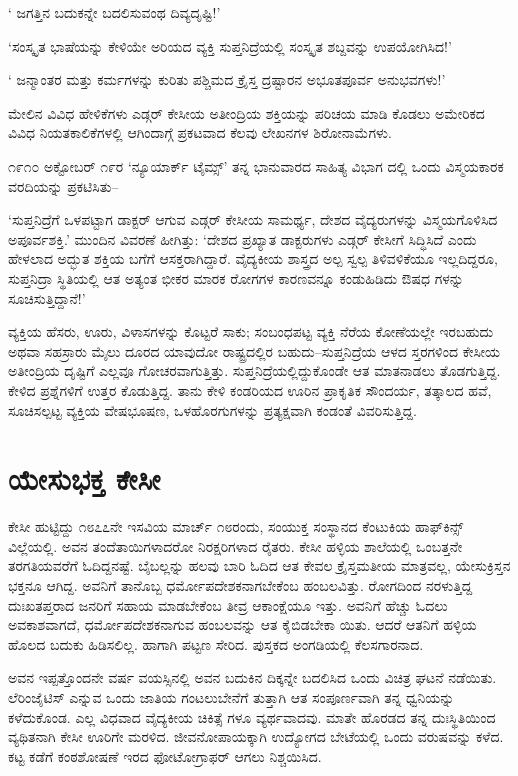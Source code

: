 ‘ ಜಗತ್ತಿನ ಬದುಕನ್ನೇ ಬದಲಿಸುವಂಥ ದಿವ್ಯದೃಷ್ಟಿ!’

‘ಸಂಸ್ಕೃತ ಭಾಷೆಯನ್ನು ಕೇಳಿಯೇ ಅರಿಯದ ವ್ಯಕ್ತಿ ಸುಪ್ತನಿದ್ರೆಯಲ್ಲಿ ಸಂಸ್ಕೃತ ಶಬ್ದವನ್ನು ಉಪಯೋಗಿಸಿದ!’

‘ ಜನ್ಮಾಂತರ ಮತ್ತು ಕರ್ಮಗಳನ್ನು ಕುರಿತು ಪಶ್ಚಿಮದ ಕ್ರೈಸ್ತ ದ್ರಷ್ಟಾರನ ಅಭೂತಪೂರ್ವ ಅನುಭವಗಳು!’

ಮೇಲಿನ ವಿವಿಧ ಹೇಳಿಕೆಗಳು ಎಡ್ಗರ್ ಕೇಸೀಯ ಅತೀಂದ್ರಿಯ ಶಕ್ತಿಯನ್ನು ಪರಿಚಯ ಮಾಡಿ ಕೊಡಲು ಅಮೇರಿಕದ ವಿವಿಧ ನಿಯತಕಾಲಿಕೆಗಳಲ್ಲಿ ಆಗಿಂದಾಗ್ಗೆ ಪ್ರಕಟವಾದ ಕೆಲವು ಲೇಖನಗಳ ಶಿರೋನಾಮೆಗಳು.

೧೯೧೦ ಅಕ್ಟೋಬರ್ ೧೯ರ ‘ನ್ಯೂಯಾರ್ಕ್ ಟೈಮ್ಸ್’ ತನ್ನ ಭಾನುವಾರದ ಸಾಹಿತ್ಯ ವಿಭಾಗ ದಲ್ಲಿ ಒಂದು ವಿಸ್ಮಯಕಾರಕ ವರದಿಯನ್ನು ಪ್ರಕಟಿಸಿತು–

‘ಸುಪ್ತನಿದ್ರೆಗೆ ಒಳಪಟ್ಟಾಗ ಡಾಕ್ಟರ್ ಆಗುವ ಎಡ್ಗರ್ ಕೇಸೀಯ ಸಾಮರ್ಥ್ಯ, ದೇಶದ ವೈದ್ಯರುಗಳನ್ನು ವಿಸ್ಮಯಗೊಳಿಸಿದ ಅಪೂರ್ವಶಕ್ತಿ.’ ಮುಂದಿನ ವಿವರಣೆ ಹೀಗಿತ್ತು: ‘ದೇಶದ ಪ್ರಖ್ಯಾತ ಡಾಕ್ಟರುಗಳು ಎಡ್ಗರ್ ಕೇಸೀಗೆ ಸಿದ್ಧಿಸಿದೆ ಎಂದು ಹೇಳಲಾದ ಅದ್ಭುತ ಶಕ್ತಿಯ ಬಗೆಗೆ ಆಸಕ್ತರಾಗಿದ್ದಾರೆ. ವೈದ್ಯಕೀಯ ಶಾಸ್ತ್ರದ ಅಲ್ಪ ಸ್ವಲ್ಪ ತಿಳಿವಳಿಕೆಯೂ ಇಲ್ಲದಿದ್ದರೂ, ಸುಪ್ತನಿದ್ರಾ ಸ್ಥಿತಿಯಲ್ಲಿ ಆತ ಅತ್ಯಂತ ಭೀಕರ ಮಾರಕ ರೋಗಗಳ ಕಾರಣವನ್ನೂ ಕಂಡುಹಿಡಿದು ಔಷಧ ಗಳನ್ನು ಸೂಚಿಸುತ್ತಿದ್ದಾನೆ!’

ವ್ಯಕ್ತಿಯ ಹೆಸರು, ಊರು, ವಿಳಾಸಗಳನ್ನು ಕೊಟ್ಟರೆ ಸಾಕು; ಸಂಬಂಧಪಟ್ಟ ವ್ಯಕ್ತಿ ನೆರೆಯ ಕೋಣೆಯಲ್ಲೇ ಇರಬಹುದು ಅಥವಾ ಸಹಸ್ರಾರು ಮೈಲು ದೂರದ ಯಾವುದೋ ರಾಷ್ಟ್ರದಲ್ಲಿರ ಬಹುದು–ಸುಪ್ತನಿದ್ರೆಯ ಆಳದ ಸ್ತರಗಳಿಂದ ಕೇಸೀಯ ಅತೀಂದ್ರಿಯ ದೃಷ್ಟಿಗೆ ಎಲ್ಲವೂ ಗೋಚರವಾಗುತ್ತಿತ್ತು. ಸುಪ್ತನಿದ್ರೆಯಲ್ಲಿದ್ದುಕೊಂಡೇ ಆತ ಮಾತನಾಡಲು ತೊಡಗುತ್ತಿದ್ದ. ಕೇಳಿದ ಪ್ರಶ್ನೆಗಳಿಗೆ ಉತ್ತರ ಕೊಡುತ್ತಿದ್ದ. ತಾನು ಕೇಳಿ ಕಂಡರಿಯದ ಊರಿನ ಪ್ರಾಕೃತಿಕ ಸೌಂದರ್ಯ, ತತ್ಕಾಲದ ಹವೆ, ಸೂಚಿಸಲ್ಪಟ್ಟ ವ್ಯಕ್ತಿಯ ವೇಷಭೂಷಣ, ಒಳಹೊರಗುಗಳನ್ನು ಪ್ರತ್ಯಕ್ಷವಾಗಿ ಕಂಡಂತೆ ವಿವರಿಸುತ್ತಿದ್ದ.


\section{ಯೇಸುಭಕ್ತ ಕೇಸೀ}

ಕೇಸೀ ಹುಟ್ಟಿದ್ದು ೧೮೭೭ನೇ ಇಸವಿಯ ಮಾರ್ಚ್ ೧೮ರಂದು, ಸಂಯುಕ್ತ ಸಂಸ್ಥಾನದ ಕೆಂಟುಕಿಯ ಹಾಫ್​ಕಿನ್ಸ್​ವಿಲ್ಲೆಯಲ್ಲಿ. ಅವನ ತಂದೆತಾಯಿಗಳಾದರೋ ನಿರಕ್ಷರಿಗಳಾದ ರೈತರು. ಕೇಸೀ ಹಳ್ಳಿಯ ಶಾಲೆಯಲ್ಲಿ ಒಂಬತ್ತನೇ ತರಗತಿಯವರೆಗೆ ಓದಿದ್ದನಷ್ಟೆ. ಬೈಬಲ್ಲನ್ನು ಹಲವು ಬಾರಿ ಓದಿದ ಆತ ಕೇವಲ ಕ್ರೈಸ್ತಮತೀಯ ಮಾತ್ರವಲ್ಲ, ಯೇಸುಕ್ರಿಸ್ತನ ಭಕ್ತನೂ ಆಗಿದ್ದ. ಅವನಿಗೆ ತಾನೊಬ್ಬ ಧರ್ಮೋಪದೇಶಕನಾಗಬೇಕೆಂಬ ಹಂಬಲವಿತ್ತು. ರೋಗದಿಂದ ನರಳುತ್ತಿದ್ದ ದುಃಖತಪ್ತರಾದ ಜನರಿಗೆ ಸಹಾಯ ಮಾಡಬೇಕೆಂಬ ತೀವ್ರ ಆಕಾಂಕ್ಷೆಯೂ ಇತ್ತು. ಅವನಿಗೆ ಹೆಚ್ಚು ಓದಲು ಅವಕಾಶವಾಗದೆ, ಧರ್ಮೋಪದೇಶಕನಾಗುವ ಹಂಬಲವನ್ನು ಆತ ಕೈಬಿಡಬೇಕಾ ಯಿತು. ಆದರೆ ಆತನಿಗೆ ಹಳ್ಳಿಯ ಹೊಲದ ಬದುಕು ಹಿಡಿಸಲಿಲ್ಲ. ಹಾಗಾಗಿ ಪಟ್ಟಣ ಸೇರಿದ. ಪುಸ್ತಕದ ಅಂಗಡಿಯಲ್ಲಿ ಕೆಲಸಗಾರನಾದ.

ಅವನ ಇಪ್ಪತ್ತೊಂದನೇ ವರ್ಷ ವಯಸ್ಸಿನಲ್ಲಿ ಅವನ ಬದುಕಿನ ದಿಕ್ಕನ್ನೇ ಬದಲಿಸಿದ ಒಂದು ವಿಚಿತ್ರ ಘಟನೆ ನಡೆಯಿತು. ಲೆರಿಂಜೈಟಿಸ್ ಎನ್ನುವ ಒಂದು ಜಾತಿಯ ಗಂಟಲುಬೇನೆಗೆ ತುತ್ತಾಗಿ ಆತ ಸಂಪೂರ್ಣವಾಗಿ ತನ್ನ ಧ್ವನಿಯನ್ನು ಕಳೆದುಕೊಂಡ. ಎಲ್ಲ ವಿಧವಾದ ವೈದ್ಯಕೀಯ ಚಿಕಿತ್ಸೆ ಗಳೂ ವ್ಯರ್ಥವಾದವು. ಮಾತೇ ಹೊರಡದ ತನ್ನ ದುಃಸ್ಥಿತಿಯಿಂದ ವ್ಯಥಿತನಾಗಿ ಕೇಸೀ ಊರಿಗೇ ಮರಳಿದ. ಜೀವನೋಪಾಯಕ್ಕಾಗಿ ಉದ್ಯೋಗದ ಬೇಟೆಯಲ್ಲಿ ಒಂದು ವರುಷವನ್ನು ಕಳೆದ. ಕಟ್ಟ ಕಡೆಗೆ ಕಂಠಶೋಷಣೆ ಇರದ ಫೋಟೋಗ್ರಾಫರ್ ಆಗಲು ನಿಶ್ಚಯಿಸಿದ.

